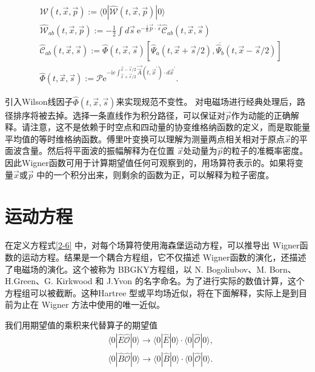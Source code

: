 \begin{equation}\label{2-6}
 \begin{aligned}
&\mathcal{W}(t,\vec{x},\vec{p}) :=\langle0|\hat{\mathcal{W}}(t,\vec{x},\vec{p})|0\rangle   \\
& \hat{\mathcal{W}}_{ab}(t,\vec{x},\vec{p}):=-\frac12\int d\overrightarrow{s}\mathrm{~e}^{-\frac{\mathrm{i}}\hbar\vec{p}\cdot\vec{s}}\hat{\mathcal{C}}_{ab}(t,\overrightarrow{x},\overrightarrow{s})  \\
&\hat{\mathcal{C}}_{ab}(t,\vec{x},\vec{s}) :=\hat{\Phi}(t,\vec{x},\vec{s})\left[\hat{\Psi}_{a}(t,\vec{x}+\vec{s}/2),\overline{\hat{\Psi}_{b}}(t,\vec{x}-\vec{s}/2)\right]  \\
&\hat{\Phi}(t,\vec{x},\vec{s}) :=\mathcal{P}\text{e}^{-\mathrm{i}e\int_{\vec{x}+\vec{s}/2}^{\vec{x}-\vec{s}/2}\vec{\hat{A}}(t,\vec{x}^{\prime})\cdot d\vec{x}^{\prime}} .
\end{aligned}
\end{equation}

引入Wilson线因子$\hat{\Phi}(t,\vec{x},\vec{s})$来实现规范不变性。
对电磁场进行经典处理后，路径排序将被去掉。选择一条直线作为积分路径，可以保证对$\vec{p}$作为动能的正确解释。请注意，这不是依赖于时空点和四动量的协变维格纳函数的定义，而是取能量平均值的等时维格纳函数。傅里叶变换可以理解为测量两点相关相对于原点$\vec{x}$的平面波含量。然后将平面波的振幅解释为在位置 $\vec{x}$处动量为$\vec{p}$的粒子的准概率密度。因此Wigner函数可用于计算期望值任何可观察到的，用场算符表示的。如果将变量$\vec{x}$或$\vec{p}$ 中的一个积分出来，则剩余的函数为正，可以解释为粒子密度。

\section{运动方程}

在定义方程式\ref{2-6} 中，对每个场算符使用海森堡运动方程，可以推导出 Wigner函数的运动方程。结果是一个耦合方程组，它不仅描述 Wigner函数的演化，还描述了电磁场的演化。这个被称为 BBGKY方程组，以 N. Bogoliubov、M. Born、H.Green、G. Kirkwood 和 J.Yvon 的名字命名。为了进行实际的数值计算，这个方程组可以被截断。这种Hartree 型或平均场近似，将在下面解释，实际上是到目前为止在 Wigner 方法中使用的唯一近似。

我们用期望值的乘积来代替算子的期望值
\begin{equation}
 \begin{aligned}
&\langle 0|\hat{E} \hat{\mathcal{O}}| 0\rangle \rightarrow\langle 0|\hat{E}| 0\rangle \cdot\langle 0|\hat{\mathcal{O}}| 0\rangle, \\
&\langle 0|\hat{B} \hat{\mathcal{O}}| 0\rangle \rightarrow\langle 0|\hat{B}| 0\rangle \cdot\langle 0|\hat{\mathcal{O}}| 0\rangle .
\end{aligned}
\end{equation}

